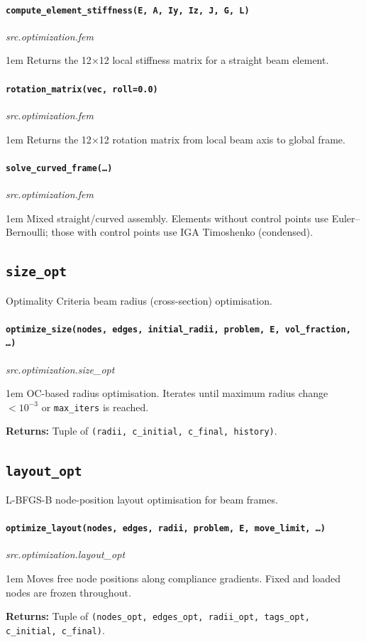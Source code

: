 \documentclass[a4paper, 11pt, openany]{report}
\newcommand{\apifunc}[2]{%
    \paragraph{\texttt{#2}}\hfill\textit{\small #1}\par\nopagebreak
}
\begin{document}
\apifunc{src.optimization.fem}{compute\_element\_stiffness(E, A, Iy, Iz, J, G, L)}
\begin{adjustwidth}{1em}{}
Returns the 12$\times$12 local stiffness matrix for a straight beam element.
\end{adjustwidth}

\apifunc{src.optimization.fem}{rotation\_matrix(vec, roll=0.0)}
\begin{adjustwidth}{1em}{}
Returns the 12$\times$12 rotation matrix from local beam axis to global frame.
\end{adjustwidth}

\apifunc{src.optimization.fem}{solve\_curved\_frame(\ldots)}
\begin{adjustwidth}{1em}{}
Mixed straight/curved assembly.  Elements without control points use
Euler--Bernoulli; those with control points use IGA Timoshenko (condensed).
\end{adjustwidth}


\subsection{\texttt{size\_opt}}

Optimality Criteria beam radius (cross-section) optimisation.

\apifunc{src.optimization.size\_opt}{optimize\_size(nodes, edges, initial\_radii, problem, E, vol\_fraction, \ldots)}
\begin{adjustwidth}{1em}{}
OC-based radius optimisation.  Iterates until maximum radius change $< 10^{-3}$
or \texttt{max\_iters} is reached.

\textbf{Returns:} Tuple of \texttt{(radii, c\_initial, c\_final, history)}.
\end{adjustwidth}


\subsection{\texttt{layout\_opt}}

L-BFGS-B node-position layout optimisation for beam frames.

\apifunc{src.optimization.layout\_opt}{optimize\_layout(nodes, edges, radii, problem, E, move\_limit, \ldots)}
\begin{adjustwidth}{1em}{}
Moves free node positions along compliance gradients.  Fixed and loaded nodes
are frozen throughout.

\textbf{Returns:} Tuple of \texttt{(nodes\_opt, edges\_opt, radii\_opt, tags\_opt, c\_initial, c\_final)}.
\end{adjustwidth}
\end{document}
